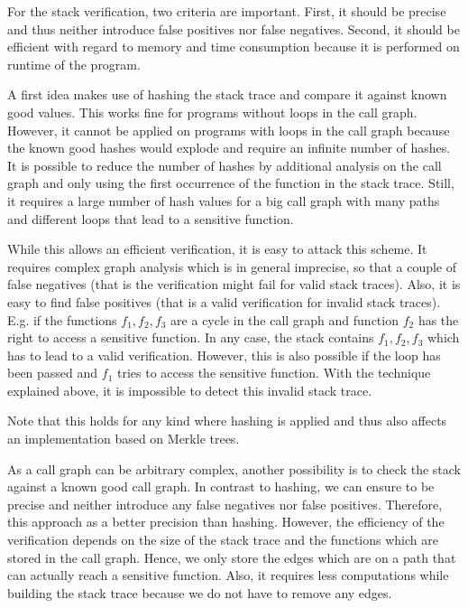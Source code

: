 \documentclass{llncs}
\begin{document}
For the stack verification, two criteria are important. First, it should be precise and thus neither introduce false positives nor false negatives. Second, it should be efficient with regard to memory and time consumption because it is performed on runtime of the program.

A first idea makes use of hashing the stack trace and compare it against known good values. This works fine for programs without loops in the call graph. However, it cannot be applied on programs with loops in the call graph because the known good hashes would explode and require an infinite number of hashes. It is possible to reduce the number of hashes by additional analysis on the call graph and only using the first occurrence of the function in the stack trace. Still, it requires a large number of hash values for a big call graph with many paths and different loops that lead to a sensitive function.

While this allows an efficient verification, it is easy to attack this scheme. It requires complex graph analysis which is in general imprecise, so that a couple of false negatives (that is the verification might fail for valid stack traces). Also, it is easy to find false positives (that is a valid verification for invalid stack traces). E.g. if the functions $f_1, f_2, f_3$ are a cycle in the call graph and function $f_2$ has the right to access a sensitive function. In any case, the stack contains $f_1, f_2, f_3$ which has to lead to a valid verification. However, this is also possible if the loop has been passed and $f_1$ tries to access the sensitive function. With the technique explained above, it is impossible to detect this invalid stack trace.

Note that this holds for any kind where hashing is applied and thus also affects an implementation based on Merkle trees.

As a call graph can be arbitrary complex, another possibility is to check the stack against a known good call graph. In contrast to hashing, we can ensure to be precise and neither introduce any false negatives nor false positives. Therefore, this approach as a better precision than hashing. However, the efficiency of the verification depends on the size of the stack trace and the functions which are stored in the call graph. Hence, we only store the edges which are on a path that can actually reach a sensitive function. Also, it requires less computations while building the stack trace because we do not have to remove any edges.
\end{document}
